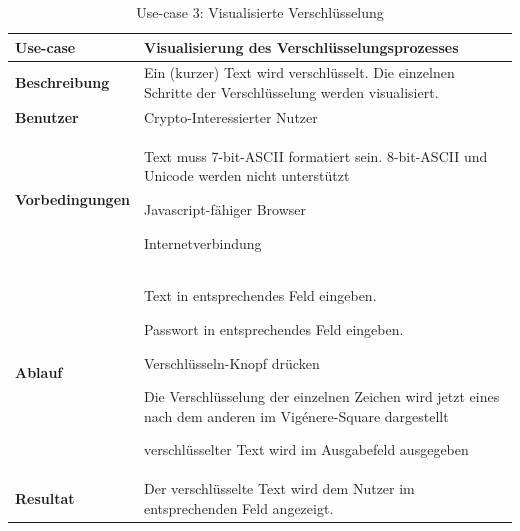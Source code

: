\documentclass[11pt,paper=a4,final]{scrartcl}
\begin{document}
\begin{table}[h!]
  \centering
  \begin{tabular}{|l|p{12cm}|}\hline
    \bf Use-case & \bf Visualisierung des Verschl\"usselungsprozesses \\ \hline
    \bf Beschreibung & Ein (kurzer) Text wird verschl\"usselt. Die einzelnen
    Schritte der Verschl\"usselung werden visualisiert. \\ \hline
    \bf Benutzer & Crypto-Interessierter Nutzer \\ \hline
    \bf Vorbedingungen & \begin{itemize*} \item Text muss 7-bit-ASCII formatiert
    sein. 8-bit-ASCII und Unicode werden nicht unterst\"utzt \item
    Javascript-f\"ahiger Browser \item Internetverbindung \end{itemize*} \\
    \hline
    \bf Ablauf & \begin{itemize*} \item Text in entsprechendes Feld eingeben.
    \item Passwort in entsprechendes Feld eingeben. \item Verschl\"usseln-Knopf
    dr\"ucken \item Die Verschl\"usselung der einzelnen Zeichen wird jetzt eines
    nach dem anderen im Vig\'enere-Square dargestellt \item verschl\"usselter
    Text wird im Ausgabefeld ausgegeben \end{itemize*} \\ \hline
    \bf Resultat & Der verschl\"usselte Text wird dem Nutzer im entsprechenden
    Feld angezeigt. \\ \hline
  \end{tabular}
  \caption{Use-case 3: Visualisierte Verschl\"usselung}
  \label{tab:usecase3}
\end{table}
\end{document}
